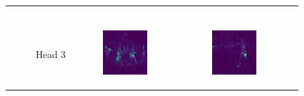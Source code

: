 \begin{figure}
\begin{tabular}{r p{\horspace} p{\horspace} p{\horspace}}
\begin{subfigure}[b]{\subfigwidth}
    \end{subfigure} \\
    Head 3 &
    \begin{subfigure}[b]{\subfigwidth}
        \includegraphics[width=\subfigwidth]{images/vit_attention/1/attn-head2.png}
    \end{subfigure}
    \hfill &
    \begin{subfigure}[b]{\subfigwidth}
        \includegraphics[width=\subfigwidth]{images/vit_attention/2/attn-head2.png}

\end{subfigure}
\end{tabular}
\end{figure}
